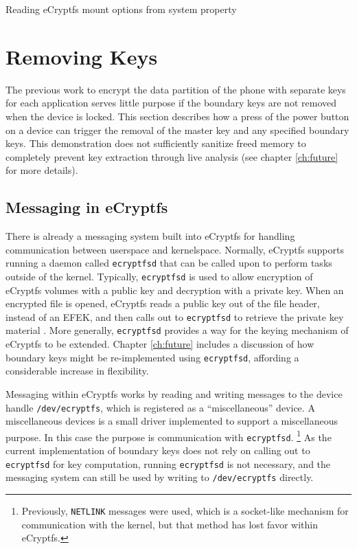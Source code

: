 \begin{table} 

\caption{Reading eCryptfs mount options from system property} 
\label{tab:init-ecryptfs-mount}
\end{table}

\section{Removing Keys}

The previous work to encrypt the data partition of the phone with separate keys for each application serves little
purpose if the boundary keys are not removed when the device is locked. This section describes how a press of the power button on a
device can trigger the removal of the master key and any specified boundary keys. This demonstration does not sufficiently sanitize
freed memory to completely prevent key extraction through live analysis (see chapter \ref{ch:future} for more details).

\subsection{Messaging in eCryptfs}
 
There is already a messaging system built into eCryptfs for handling communication between userspace and kernelspace. Normally,
eCryptfs supports running a daemon called \texttt{ecryptfsd} that can be called upon to perform tasks outside of the kernel.
Typically, \texttt{ecryptfsd} is used to allow encryption of eCryptfs volumes with a public key and decryption with a private key.
When an encrypted file is opened, eCryptfs reads a public key out of the file header, instead of an EFEK, and then calls out to
\texttt{ecryptfsd} to retrieve the private key material \cite{ecryptfspki}. More generally, \texttt{ecryptfsd} provides a way 
for the keying mechanism of eCryptfs to be extended.  Chapter \ref{ch:future} includes a discussion of how boundary keys might be
re-implemented using \texttt{ecryptfsd}, affording a considerable increase in flexibility.

Messaging within eCryptfs works by reading and writing messages to the device handle \texttt{/dev/ecryptfs}, which is registered as a
``miscellaneous'' device. A miscellaneous devices is a small driver implemented to support a miscellaneous purpose. In this case the
purpose is communication with \texttt{ecryptfsd}. \footnote{Previously, \texttt{NETLINK} messages were used, which is a socket-like
mechanism for communication with the kernel, but that method has lost favor within eCryptfs.} As the current implementation of
boundary keys does not rely on calling out to \texttt{ecryptfsd} for key computation, running \texttt{ecryptfsd} is not necessary,
and the messaging system can still be used by writing to \texttt{/dev/ecryptfs} directly. 

